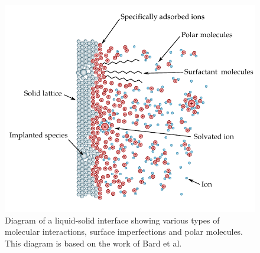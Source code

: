   \begin{figure}
    \begin{center}
      \includegraphics{content/introduction/graphics/interface}
    \end{center}
    \caption[Diagram of a liquid-solid interface showing various types of molecular interactions.]{Diagram of a liquid-solid interface showing various types of molecular interactions, surface imperfections and polar molecules. This diagram is based on the work of Bard et al.\ ~\cite{Bard1993}}
    \label{fig:interface}
  \end{figure}

